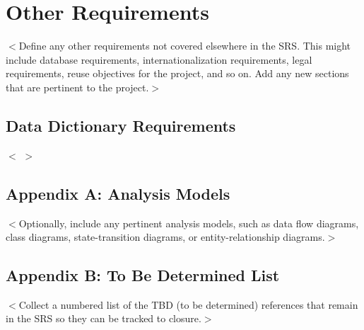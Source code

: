\documentclass[16pt]{scrreprt}
\begin{document}


\chapter{Other Requirements}
\label{Other Requirements}
$<$Define any other requirements not covered elsewhere in the SRS. This might 
include database requirements, internationalization requirements, legal 
requirements, reuse objectives for the project, and so on. Add any new sections 
that are pertinent to the project.$>$

\section{Data Dictionary Requirements}
$<$ $>$


\section{Appendix A: Analysis Models}
$<$Optionally, include any pertinent analysis models, such as data flow 
diagrams, class diagrams, state-transition diagrams, or entity-relationship 
diagrams.$>$

\section{Appendix B: To Be Determined List}
$<$Collect a numbered list of the TBD (to be determined) references that remain 
in the SRS so they can be tracked to closure.$>$
\end{document}
